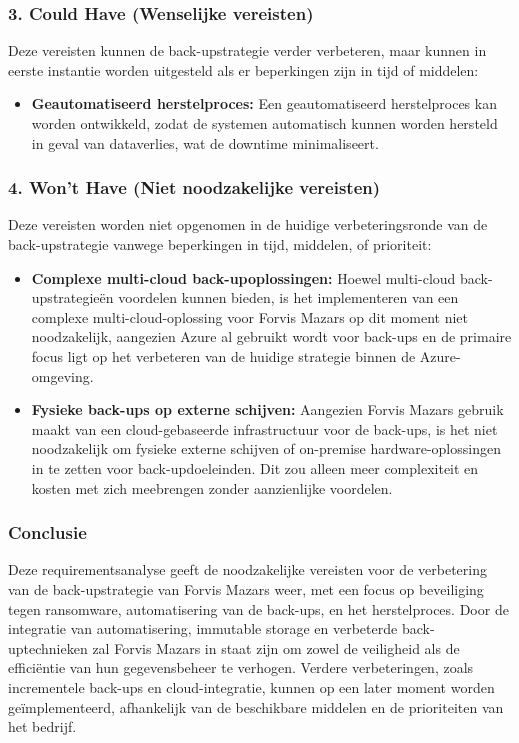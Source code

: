 \subsubsection{3. Could Have (Wenselijke vereisten)}
Deze vereisten kunnen de back-upstrategie verder verbeteren, maar kunnen in eerste instantie worden uitgesteld als er beperkingen zijn in tijd of middelen:

\begin{itemize}
    \item \textbf{Geautomatiseerd herstelproces:} Een geautomatiseerd herstelproces kan worden ontwikkeld, zodat de systemen automatisch kunnen worden hersteld in geval van dataverlies, wat de downtime minimaliseert.
\end{itemize}

\subsubsection{4. Won't Have (Niet noodzakelijke vereisten)}
Deze vereisten worden niet opgenomen in de huidige verbeteringsronde van de back-upstrategie vanwege beperkingen in tijd, middelen, of prioriteit:

\begin{itemize}
    \item \textbf{Complexe multi-cloud back-upoplossingen:} Hoewel multi-cloud back-upstrategieën voordelen kunnen bieden, is het implementeren van een complexe multi-cloud-oplossing voor Forvis Mazars op dit moment niet noodzakelijk, aangezien Azure al gebruikt wordt voor back-ups en de primaire focus ligt op het verbeteren van de huidige strategie binnen de Azure-omgeving.
    
    \item \textbf{Fysieke back-ups op externe schijven:} Aangezien Forvis Mazars gebruik maakt van een cloud-gebaseerde infrastructuur voor de back-ups, is het niet noodzakelijk om fysieke externe schijven of on-premise hardware-oplossingen in te zetten voor back-updoeleinden. Dit zou alleen meer complexiteit en kosten met zich meebrengen zonder aanzienlijke voordelen.
\end{itemize}

\subsubsection{Conclusie}
Deze requirementsanalyse geeft de noodzakelijke vereisten voor de verbetering van de back-upstrategie van Forvis Mazars weer, met een focus op beveiliging tegen ransomware, automatisering van de back-ups, en het herstelproces. Door de integratie van automatisering, immutable storage en verbeterde back-uptechnieken zal Forvis Mazars in staat zijn om zowel de veiligheid als de efficiëntie van hun gegevensbeheer te verhogen. Verdere verbeteringen, zoals incrementele back-ups en cloud-integratie, kunnen op een later moment worden geïmplementeerd, afhankelijk van de beschikbare middelen en de prioriteiten van het bedrijf.

